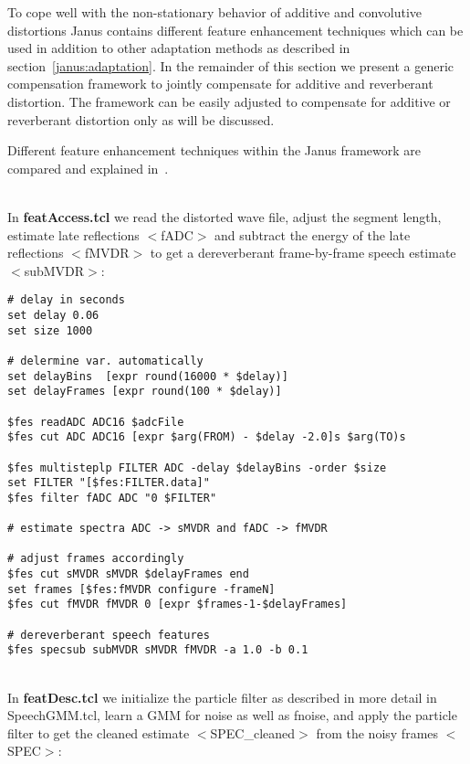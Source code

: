 To cope well with the non-stationary behavior of additive and convolutive distortions Janus contains different feature enhancement techniques which can be used in addition to other adaptation methods as described in section~\ref{janus:adaptation}. In the remainder of this section we present a generic compensation framework to jointly compensate for additive and reverberant distortion. The framework can be easily adjusted to compensate for additive or reverberant distortion only as will be discussed.

Different feature enhancement techniques within the Janus framework are compared and explained in~\cite{Wolfel2008e,Wiley}.

~ \\

\noindent
In \textbf{featAccess.tcl} we read the distorted wave file, adjust the segment length, estimate late reflections $<$fADC$>$ and subtract the energy of the late reflections $<$fMVDR$>$ to get a dereverberant frame-by-frame speech estimate $<$subMVDR$>$:
\begin{verbatim}
# delay in seconds
set delay 0.06
set size 1000 

# delermine var. automatically
set delayBins  [expr round(16000 * $delay)]
set delayFrames [expr round(100 * $delay)] 

$fes readADC ADC16 $adcFile
$fes cut ADC ADC16 [expr $arg(FROM) - $delay -2.0]s $arg(TO)s

$fes multisteplp FILTER ADC -delay $delayBins -order $size
set FILTER "[$fes:FILTER.data]"
$fes filter fADC ADC "0 $FILTER"

# estimate spectra ADC -> sMVDR and fADC -> fMVDR

# adjust frames accordingly
$fes cut sMVDR sMVDR $delayFrames end
set frames [$fes:fMVDR configure -frameN]
$fes cut fMVDR fMVDR 0 [expr $frames-1-$delayFrames]

# dereverberant speech features
$fes specsub subMVDR sMVDR fMVDR -a 1.0 -b 0.1
\end{verbatim}

~ \\

\noindent
In \textbf{featDesc.tcl} we initialize the particle filter as described in more detail in SpeechGMM.tcl, learn a GMM for noise as well as fnoise, and apply the particle filter to get the cleaned estimate $<$SPEC\_cleaned$>$ from the noisy frames $<$SPEC$>$:

